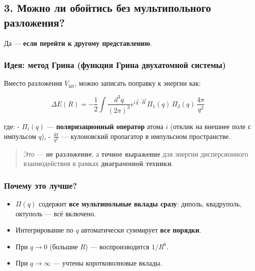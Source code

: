 \documentclass[11pt]{article}
\providecommand{\tightlist}{%
      \setlength{\itemsep}{0pt}\setlength{\parskip}{0pt}}
\begin{document}
\subsection{3. Можно ли обойтись без мультипольного
разложения?}\label{ux43cux43eux436ux43dux43e-ux43bux438-ux43eux431ux43eux439ux442ux438ux441ux44c-ux431ux435ux437-ux43cux443ux43bux44cux442ux438ux43fux43eux43bux44cux43dux43eux433ux43e-ux440ux430ux437ux43bux43eux436ux435ux43dux438ux44f}

Да --- \textbf{если перейти к другому представлению}.

\subsubsection{\texorpdfstring{Идея: \textbf{метод Грина (функция Грина
двухатомной
системы)}}{Идея: метод Грина (функция Грина двухатомной системы)}}\label{ux438ux434ux435ux44f-ux43cux435ux442ux43eux434-ux433ux440ux438ux43dux430-ux444ux443ux43dux43aux446ux438ux44f-ux433ux440ux438ux43dux430-ux434ux432ux443ux445ux430ux442ux43eux43cux43dux43eux439-ux441ux438ux441ux442ux435ux43cux44b}

Вместо разложения \(V_{\text{int}}\), можно записать поправку к энергии
как:

\[
\Delta E(R) = -\frac{1}{2} \int \frac{d^3q}{(2\pi)^3} e^{i \vec{q} \cdot \vec{R}} \, \Pi_1(q) \, \Pi_2(q) \, \frac{4\pi}{q^2}
\]

где: - \(\Pi_i(q)\) --- \textbf{поляризационный оператор} атома \(i\)
(отклик на внешнее поле с импульсом \(q\)), - \(\frac{4\pi}{q^2}\) ---
кулоновский пропагатор в импульсном пространстве.

\begin{quote}
Это --- \textbf{не разложение}, а \textbf{точное выражение} для энергии
дисперсионного взаимодействия в рамках \textbf{диаграммной техники}.
\end{quote}

\subsubsection{Почему это
лучше?}\label{ux43fux43eux447ux435ux43cux443-ux44dux442ux43e-ux43bux443ux447ux448ux435}

\begin{itemize}
\tightlist
\item
  \(\Pi(q)\) содержит \textbf{все мультипольные вклады сразу}: диполь,
  квадруполь, октуполь --- всё включено.
\item
  Интегрирование по \(q\) автоматически суммирует \textbf{все порядки}.
\item
  При \(q \to 0\) (большие \(R\)) --- воспроизводится \(1/R^6\).
\item
  При \(q \to \infty\) --- учтены коротковолновые вклады.
\end{itemize}
\end{document}
